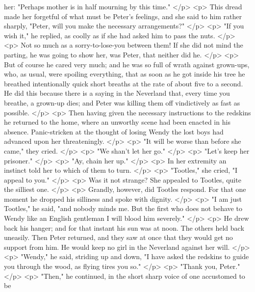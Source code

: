       her: "Perhaps mother is in half mourning by this time."
    </p>
    <p>
      This dread made her forgetful of what must be Peter's feelings, and she
      said to him rather sharply, "Peter, will you make the necessary
      arrangements?"
    </p>
    <p>
      "If you wish it," he replied, as coolly as if she had asked him to pass
      the nuts.
    </p>
    <p>
      Not so much as a sorry-to-lose-you between them! If she did not mind the
      parting, he was going to show her, was Peter, that neither did he.
    </p>
    <p>
      But of course he cared very much; and he was so full of wrath against
      grown-ups, who, as usual, were spoiling everything, that as soon as he got
      inside his tree he breathed intentionally quick short breaths at the rate
      of about five to a second. He did this because there is a saying in the
      Neverland that, every time you breathe, a grown-up dies; and Peter was
      killing them off vindictively as fast as possible.
    </p>
    <p>
      Then having given the necessary instructions to the redskins he returned
      to the home, where an unworthy scene had been enacted in his absence.
      Panic-stricken at the thought of losing Wendy the lost boys had advanced
      upon her threateningly.
    </p>
    <p>
      "It will be worse than before she came," they cried.
    </p>
    <p>
      "We shan't let her go."
    </p>
    <p>
      "Let's keep her prisoner."
    </p>
    <p>
      "Ay, chain her up."
    </p>
    <p>
      In her extremity an instinct told her to which of them to turn.
    </p>
    <p>
      "Tootles," she cried, "I appeal to you."
    </p>
    <p>
      Was it not strange? She appealed to Tootles, quite the silliest one.
    </p>
    <p>
      Grandly, however, did Tootles respond. For that one moment he dropped his
      silliness and spoke with dignity.
    </p>
    <p>
      "I am just Tootles," he said, "and nobody minds me. But the first who does
      not behave to Wendy like an English gentleman I will blood him severely."
    </p>
    <p>
      He drew back his hanger; and for that instant his sun was at noon. The
      others held back uneasily. Then Peter returned, and they saw at once that
      they would get no support from him. He would keep no girl in the Neverland
      against her will.
    </p>
    <p>
      "Wendy," he said, striding up and down, "I have asked the redskins to
      guide you through the wood, as flying tires you so."
    </p>
    <p>
      "Thank you, Peter."
    </p>
    <p>
      "Then," he continued, in the short sharp voice of one accustomed to be
